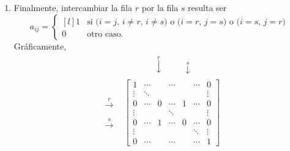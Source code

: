 \documentclass{beamer} %
\renewcommand{\_}[1]{_{\left[ #1 \right]}}
\renewcommand{\^}[1]{^{\left[ #1 \right]}}
\begin{document}
\begin{frame}
    \begin{enumerate}
    \item[\color{blue}{E3.}]  Finalmente, intercambiar la fila $r$ por la fila $s$ resulta ser
        \begin{equation*}\label{elem-tipo-3}
        a_{ij} = \left\{ 
        \begin{matrix*}[l]
        1 &\text{si ($i=j$, $i \ne r$, $i \ne s$) o ($i=r$, $j=s$) o ($i=s$, $j=r$) }\\
        0 \quad&\text{otro caso.}
        \end{matrix*}\right.
        \end{equation*}\pause
        Gráficamente, 
            {\footnotesize
                \begin{align*}
        &\begin{matrix}
        {}^{}&{}^{}&{}^{}&{}^{}&\overset{r}{\downarrow}&{}^{}&{}^{}&{}^{}{}^{}\overset{s}{\downarrow}&{}^{}
        \end{matrix} \\
        \begin{matrix}
        {}^{}\\{}^{}\\
        \overset{r}{\to}\\
        {}^{}\\
        \overset{s}{\to}\\{}^{}\\
        {}^{}
        \end{matrix}
        &\begin{bmatrix}
        1 & \cdots &  &\cdots &&\cdots& 0  \\
        \vdots  & \ddots  & & &&& \vdots \\
        0 & \cdots &0 &\cdots&1&\cdots &0 \\
        \vdots  &   & &\ddots &&& \vdots \\
        0  & \cdots  &1 &\cdots &0& \cdots& 0 \\
        \vdots  &   & & &&\ddots& \vdots \\
        0  & \cdots  & &\cdots &&\cdots& 1
        \end{bmatrix}\tag{E3}
        \end{align*}
        }
    \end{enumerate}
\end{frame}
\end{document}
